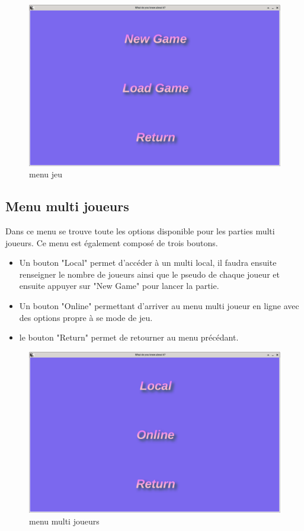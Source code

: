 \begin{figure}[h]
	\centering
	\includegraphics[width=\textwidth]{menujeu.png}
	\caption{menu jeu}
	\label{fig:menu_jeu}
\end{figure}

\newpage
\subsection{Menu multi joueurs}
Dans ce menu se trouve toute les options disponible pour les parties multi joueurs. Ce menu est également 
composé de trois boutons.
\begin{itemize}
	\item Un bouton "Local" permet d'accéder à un multi local, il faudra ensuite renseigner le nombre de joueurs
		ainsi que le pseudo de chaque joueur et ensuite appuyer sur "New Game" pour lancer la partie.
	\item Un bouton "Online" permettant d'arriver au menu multi joueur en ligne avec des options propre à se 
		mode de jeu.
	\item le bouton "Return" permet de retourner au menu précédant.
\end{itemize} 

\begin{figure}[h]
	\centering
	\includegraphics[width=\textwidth]{menumulti.png}
	\caption{menu multi joueurs}
	\label{fig:menu_multi_joueurs}
\end{figure}

